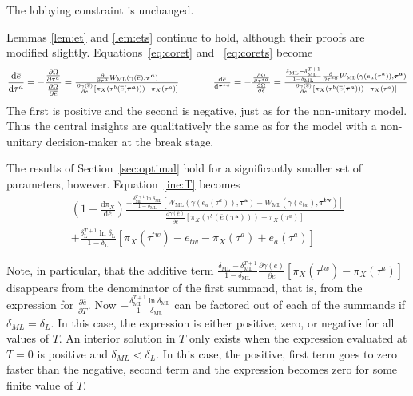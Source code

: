 \documentclass[authoryear, review]{elsarticle}
\newcommand{\ov}{\overline}
\newcommand{\bta}{\bm{\tau^a}}
\newcommand{\ga}{\gamma}
\newcommand{\btw}{\bm{\tau^{tw}}}
\newcommand{\de}{\delta}
\begin{document}
The lobbying constraint is unchanged.

Lemmas \ref{lem:et} and \ref{lem:ets} continue to hold, although their proofs are modified slightly. Equations~\ref{eq:coret} and ~\ref{eq:corets} become
\begin{equation*}
 	\frac{\mathrm{d} \ov{e}}{\mathrm{d} \tau^a} = -\frac{\frac{\partial \Omega}{\partial \tau^a}}{\frac{\partial \Omega}{\partial \ov{e}}} =
	\textstyle \frac{\frac{\partial}{\partial \tau^a}W_\text{ML}(\ga(\ov{e}),\bta)}{\frac{\partial \ga(\ov{e})}{\partial e}\left[ \pi_X(\tau^b(\ov{e}(\bta))) - \pi_X(\tau^{a}) \right]} \hskip.5in 	\frac{\mathrm{d} \ov{e}}{\mathrm{d} \tau^{*a}} = -\frac{\frac{\partial \Omega}{\partial \tau^{*a}}}{\frac{\partial \Omega}{\partial \ov{e}}} = 
	\textstyle \frac{\frac{\de_\text{ML} - \de_\text{ML}^{T+1}}{1-\de_\text{ML}} \frac{\partial}{\partial \tau^{*a}}W_\text{ML}(\ga(e_a(\tau^a)),\bta)}{\frac{\partial \ga(\ov{e})}{\partial e}\left[ \pi_X(\tau^b(\ov{e}(\bta))) - \pi_X(\tau^{a}) \right]}
\end{equation*}
The first is positive and the second is negative, just as for the non-unitary model. Thus the central insights are qualitatively the same as for the model with a non-unitary decision-maker at the break stage.

The results of Section~\ref{sec:optimal} hold for a significantly smaller set of parameters, however. Equation~\ref{ine:T} becomes
\begin{multline}
 	\left(1 - \frac{\mathrm{d} \pi_X}{\mathrm{d} \ov{e}} \right) \frac{ -\frac{\de_\text{ML}^{T+1}\ln\de_\text{ML}}{1-\de_\text{ML}}\left[  W_\text{ML}(\ga(e_a(\tau^a)),\bta) - W_\text{ML}(\ga(e_{tw}),\btw) \right]}{\frac{\partial \ga(\ov{e})}{\partial e} \left[ \pi_X(\tau^b(\ov{e}(\bta))) - \pi_X(\tau^a) \right]} \\
	+  \frac{\de_\text{L}^{T+1} \ln \de_\text{L}}{1-\de_\text{L}} \left[ \pi_X(\tau^{tw}) - e_{tw} -\pi_X(\tau^a) + e_a(\tau^a) \right]
	\label{eq:uniopt}
\end{multline}

Note, in particular, that the additive term $\frac{\de_\text{ML} - \de_\text{ML}^{T+1}}{1-\de_\text{ML}}\frac{\partial \ga(\ov{e})}{\partial e} \left[ \pi_X(\tau^{tw}) - \pi_X(\tau^a) \right]$ disappears from the denominator of the first summand, that is, from the expression for $\frac{\partial \ov{e}}{\partial T}.$ Now $-\frac{\de_\text{ML}^{T+1}\ln\de_\text{ML}}{1-\de_\text{ML}}$ can be factored out of each of the summands if $\de_{ML} = \de_L$. In this case, the expression is either positive, zero, or negative for all values of $T$. An interior solution in $T$ only exists when the expression evaluated at $T=0$ is positive and $\de_{ML} < \de_L$. In this case, the positive, first term goes to zero faster than the negative, second term and the expression becomes zero for some finite value of $T$.
\end{document}

